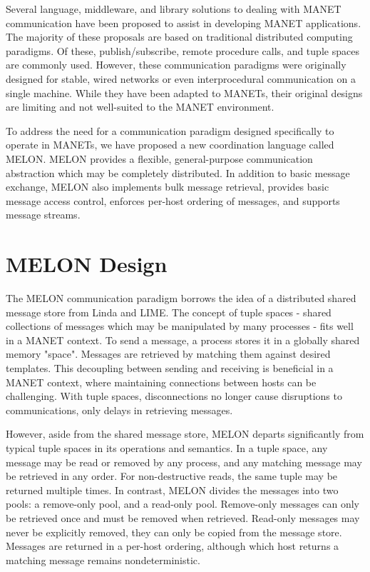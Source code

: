 \documentclass{llncs}
\begin{document}
Several language, middleware, and library solutions to dealing with MANET communication have been proposed to assist in developing MANET applications. The majority of these proposals are based on traditional distributed computing paradigms\cite{mine}. Of these, publish/subscribe, remote procedure calls, and tuple spaces are commonly used. However, these communication paradigms were originally designed for stable, wired networks or even interprocedural communication on a single machine. While they have been adapted to MANETs, their original designs are limiting and not well-suited to the MANET environment\cite{collins2010quantitative}.

To address the need for a communication paradigm designed specifically to operate in MANETs, we have proposed a new coordination language called MELON\cite{melon}. MELON provides a flexible, general-purpose communication abstraction which may be completely distributed. In addition to basic message exchange, MELON also implements bulk message retrieval, provides basic message access control, enforces per-host ordering of messages, and supports message streams.

\section{MELON Design}\label{sec:design}

The MELON communication paradigm borrows the idea of a distributed shared message store from Linda\cite{linda} and LIME\cite{lime}. The concept of tuple spaces - shared collections of messages which may be manipulated by many processes - fits well in a MANET context. To send a message, a process stores it in a globally shared memory "space". Messages are retrieved by matching them against desired templates. This decoupling between sending and receiving is beneficial in a MANET context, where maintaining connections between hosts can be challenging. With tuple spaces, disconnections no longer cause disruptions to communications, only delays in retrieving messages.

However, aside from the shared message store, MELON departs significantly from typical tuple spaces in its operations and semantics. In a tuple space, any message may be read or removed by any process, and any matching message may be retrieved in any order. For non-destructive reads, the same tuple may be returned multiple times. In contrast, MELON divides the messages into two pools: a remove-only pool, and a read-only pool. Remove-only messages can only be retrieved once and must be removed when retrieved. Read-only messages may never be explicitly removed, they can only be copied from the message store. Messages are returned in a per-host ordering, although which host returns a matching message remains nondeterministic.
\end{document}
